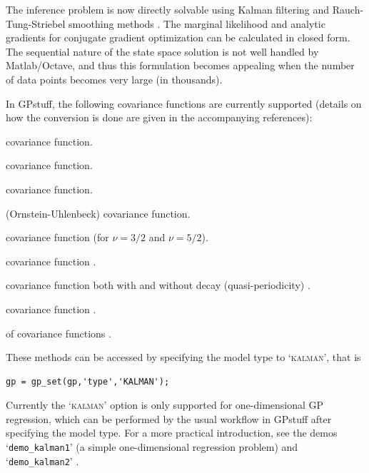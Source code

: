 \documentclass[twoside,11pt]{article}
\newcommand{\pkg}[1]{{\fontseries{b}\selectfont #1}}
\newcommand{\code}[1]{{\normalfont\texttt{#1}}}
\begin{document}
The inference problem is now directly solvable using Kalman filtering and
Rauch-Tung-Striebel smoothing methods \citep{Grewal+Andrews:2001, Sarkka:2013}.
The marginal likelihood and analytic gradients for conjugate gradient
optimization can be calculated in closed form. The sequential nature of the
state space solution is not well handled by Matlab/Octave, and thus this
formulation becomes appealing when the number of data points becomes very large
(in thousands).

In \pkg{GPstuff}, the following covariance functions are currently supported
(details on how the conversion is done are given in the accompanying
references):
%
\begin{description}[labelindent=\parindent]
  \item[Constant] 
    covariance function.
  \item[Noise] 
    covariance function.
  \item[Linear] 
    covariance function.
  \item[Exponential] 
    (Ornstein-Uhlenbeck) covariance function.
  \item[Mat\'ern] 
    covariance function (for $\nu=3/2$ and $\nu=5/2$).
  \item[Squared exponential] 
    covariance function \citep[as presented in][]{Hartikainen+Sarkka:2010}.
  \item[Periodic] 
    covariance function both with and without decay (quasi-periodicity) 
    \citep[as presented in][]{Solin+Sarkka:2014}.
  \item[Rational quadratic] 
    covariance function \citep[as presented in][]{Solin+Sarkka:2014-MLSP}.
  \item[Sums and products] 
    of covariance functions \citep[as given in][]{Solin+Sarkka:2014}.
\end{description}
%
These methods can be accessed by specifying the model type to 
`\textsc{kalman}', that is
%
\begin{verbatim}
gp = gp_set(gp,'type','KALMAN');
\end{verbatim}
%
Currently the `\textsc{kalman}' option is only supported for one-dimensional GP
regression, which can be performed by the usual workflow in \pkg{GPstuff}
after specifying the model type. For a more practical introduction, see the
demos `\code{demo\_kalman1}' (a simple one-dimensional regression problem) and
`\code{demo\_kalman2}' \citep[periodic modeling of the Mauna Loa $\text{CO}_2$
data, following][]{Solin+Sarkka:2014}.
\end{document}
